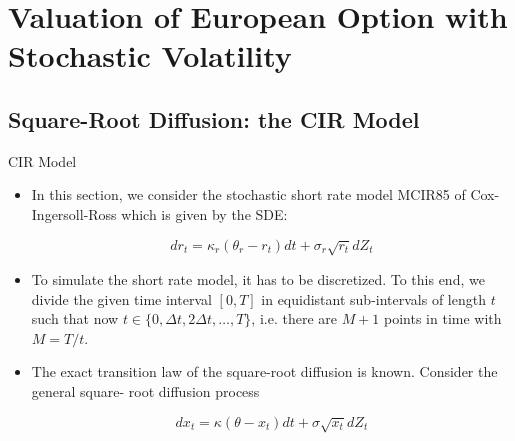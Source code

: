 \documentclass[11pt]{beamer}
\begin{document}
\section{Valuation of European Option with Stochastic Volatility}
\subsection{Square-Root Diffusion: the CIR Model}
\begin{frame}{CIR Model}
\begin{itemize}
\item In this section, we consider the stochastic short rate model MCIR85 of Cox- Ingersoll-Ross which is given by the SDE: 

\begin{equation}
\boxed{
dr_t = \kappa_r (\theta_r - r_t) dt + \sigma_r \sqrt{r_t} dZ_t}
\end{equation}

\item To simulate the short rate model, it has to be discretized. To this end, we  divide the given time interval $[0, T ]$ in equidistant sub-intervals of length  $t$ such that now $t \in \{0,  \Delta t, 2 \Delta t, \dots, T \}$, i.e. there are $M + 1$ points in time with $M = T/t$.

\item The exact transition law of the square-root diffusion is known.  Consider the general square- root diffusion process

\begin{equation}
dx_t = \kappa (\theta - x_t) dt + \sigma \sqrt{x_t} dZ_t  
\end{equation}

\end{itemize}
\end{frame}
\end{document}
